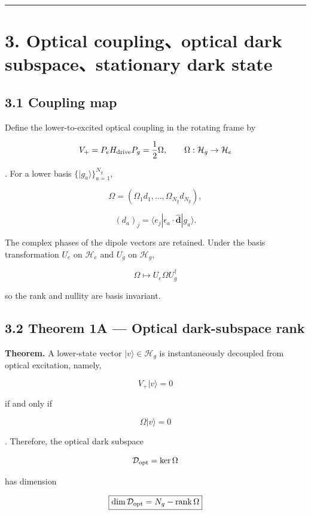 \documentclass[
  10pt,
  a4paper,
]{article}
\begin{document}
\begin{center}\rule{0.5\linewidth}{0.5pt}\end{center}

\section{3. Optical coupling、optical dark subspace、stationary dark
state}\label{optical-couplingoptical-dark-subspacestationary-dark-state}

\subsection{3.1 Coupling map}\label{coupling-map}

Define the lower-to-excited optical coupling in the rotating frame by

\[
V_+=P_eH_{\rm drive}P_g=\frac12\Omega,
\qquad
\Omega:\mathcal H_g\rightarrow\mathcal H_e
\]

. For a lower basis \(\{|g_a\rangle\}_{a=1}^{N_g}\),

\[
\Omega=(\Omega_1d_1,\ldots,\Omega_{N_g}d_{N_g}),
\]

\[
(d_a)_j
=\langle e_j|\epsilon_a\cdot\hat{\mathbf d}|g_a\rangle.
\]

The complex phases of the dipole vectors are retained. Under the basis
transformation \(U_e\) on \(\mathcal H_e\) and \(U_g\) on
\(\mathcal H_g\),

\[
\Omega\mapsto U_e\Omega U_g^\dagger
\]

so the rank and nullity are basis invariant.

\subsection{3.2 Theorem 1A --- Optical dark-subspace
rank}\label{theorem-1a-optical-dark-subspace-rank}

\textbf{Theorem.} A lower-state vector \(|v\rangle\in\mathcal H_g\) is
instantaneously decoupled from optical excitation, namely,

\[
V_+|v\rangle=0
\]

if and only if

\[
\Omega|v\rangle=0
\]

. Therefore, the optical dark subspace

\[
\mathcal D_{\rm opt}=\ker\Omega
\]

has dimension

\[
\boxed{
\dim\mathcal D_{\rm opt}
=N_g-\operatorname{rank}\Omega
}
\]
\end{document}

